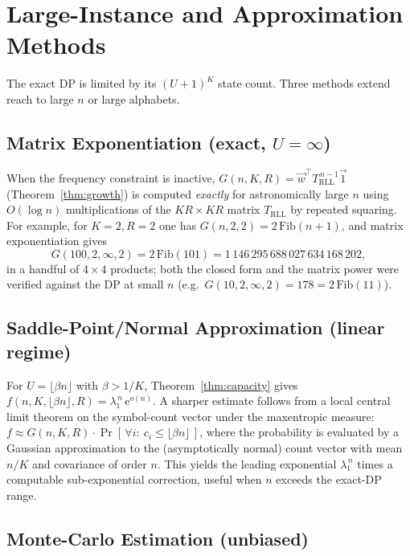 \documentclass[a4paper,12pt]{article}
\begin{document}
\section{Large-Instance and Approximation Methods}
\label{sec:approx}

The exact DP is limited by its $(U+1)^K$ state count. Three methods
extend reach to large $n$ or large alphabets.

\subsection{Matrix Exponentiation (exact, $U=\infty$)}

When the frequency constraint is inactive, $G(n,K,R)=\vec w^\top
T_{\mathrm{RLL}}^{\,n-1}\vec1$ (Theorem~\ref{thm:growth}) is computed
\emph{exactly} for astronomically large $n$ using
$O(\log n)$ multiplications of the $KR\times KR$ matrix
$T_{\mathrm{RLL}}$ by repeated squaring. For example, for $K=2,R=2$ one
has $G(n,2,2)=2\,\mathrm{Fib}(n+1)$, and matrix exponentiation gives
\begin{equation}
G(100,2,\infty,2)=2\,\mathrm{Fib}(101)=1\,146\,295\,688\,027\,634\,168\,202,
\end{equation}
in a handful of $4\times4$ products; both the closed form and the
matrix power were verified against the DP at small $n$
(e.g.\ $G(10,2,\infty,2)=178=2\,\mathrm{Fib}(11)$).

\subsection{Saddle-Point/Normal Approximation (linear regime)}

For $U=\lfloor\beta n\rfloor$ with $\beta>1/K$,
Theorem~\ref{thm:capacity} gives $f(n,K,\lfloor\beta n\rfloor,R)=
\lambda_1^{\,n}\,\mathrm{e}^{o(n)}$.  A sharper estimate follows from a
local central limit theorem on the symbol-count vector under the
maxentropic measure: $f\approx G(n,K,R)\cdot
\Pr[\,\forall i:\ c_i\le\lfloor\beta n\rfloor\,]$, where the
probability is evaluated by a Gaussian approximation to the
(asymptotically normal) count vector with mean $n/K$ and covariance of
order $n$.  This yields the leading exponential $\lambda_1^{\,n}$ times
a computable sub-exponential correction, useful when $n$ exceeds the
exact-DP range.

\subsection{Monte-Carlo Estimation (unbiased)}
\end{document}
